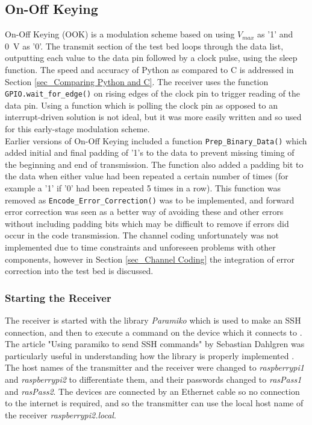 \documentclass[../main.tex]{subfiles}
\begin{document}
\subsection{On-Off Keying} \label{sec_On-Off Keying}

On-Off Keying (OOK) is a modulation scheme based on using $V_{max}$ as '1' and \SI{0}{\volt} as '0'.
The transmit section of the test bed loops through the data list, outputting each value to the data pin followed by a clock pulse, using the sleep function.
The speed and accuracy of Python as compared to C is addressed in Section \ref{sec_Comparing Python and C}.
The receiver uses the function \colorbox{backcolour}{\lstinline{GPIO.wait_for_edge()}} on rising edges of the clock pin to trigger reading of the data pin.
Using a function which is polling the clock pin as opposed to an interrupt-driven solution is not ideal, but it was more easily written and so used for this early-stage modulation scheme.\\

Earlier versions of On-Off Keying included a function \colorbox{backcolour}{\lstinline{Prep_Binary_Data()}} which added initial and final padding of '1's to the data to prevent missing timing of the beginning and end of transmission.
The function also added a padding bit to the data when either value had been repeated a certain number of times (for example a '1' if '0' had been repeated 5 times in a row).
This function was removed as \colorbox{backcolour}{\lstinline{Encode_Error_Correction()}} was to be implemented, and forward error correction was seen as a better way of avoiding these and other errors without including padding bits which may be difficult to remove if errors did occur in the code transmission.
The channel coding unfortunately was not implemented due to time constraints and unforeseen problems with other components, however in Section \ref{sec_Channel Coding} the integration of error correction into the test bed is discussed.\\

\subsubsection{Starting the Receiver} \label{sec_SSH}

The receiver is started with the library \textit{Paramiko} which is used to make an SSH connection, and then to execute a command on the device which it connects to \cite{lib_Paramiko}.
The article "Using paramiko to send SSH commands" by Sebastian Dahlgren was particularly useful in understanding how the library is properly implemented \cite{web_ParamikoSSH}.
The host names of the transmitter and the receiver were changed to \textit{raspberrypi1} and \textit{raspberrypi2} to differentiate them, and their passwords changed to \textit{rasPass1} and \textit{rasPass2}.
The devices are connected by an Ethernet cable so no connection to the internet is required, and so the transmitter can use the local host name of the receiver \textit{raspberrypi2.local}.\\
\end{document}
